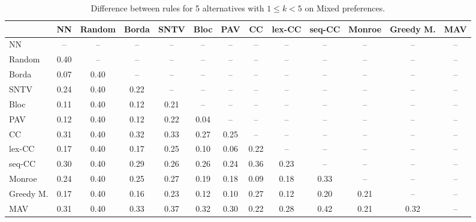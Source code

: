 
\begin{table*}[htbp]
\centering
\begin{tabular}{lcccccccccccc}
\toprule
 & NN & Random & Borda & SNTV & Bloc & PAV & CC & lex-CC & seq-CC & Monroe & Greedy M. & MAV \\
\midrule
NN & -- & -- & -- & -- & -- & -- & -- & -- & -- & -- & -- & -- \\
Random & \cellcolor{blue!40} 0.40 & -- & -- & -- & -- & -- & -- & -- & -- & -- & -- & -- \\
Borda & \cellcolor{blue!7} 0.07 & \cellcolor{blue!40} 0.40 & -- & -- & -- & -- & -- & -- & -- & -- & -- & -- \\
SNTV & \cellcolor{blue!24} 0.24 & \cellcolor{blue!40} 0.40 & \cellcolor{blue!22} 0.22 & -- & -- & -- & -- & -- & -- & -- & -- & -- \\
Bloc & \cellcolor{blue!11} 0.11 & \cellcolor{blue!40} 0.40 & \cellcolor{blue!12} 0.12 & \cellcolor{blue!21} 0.21 & -- & -- & -- & -- & -- & -- & -- & -- \\
PAV & \cellcolor{blue!12} 0.12 & \cellcolor{blue!40} 0.40 & \cellcolor{blue!12} 0.12 & \cellcolor{blue!22} 0.22 & \cellcolor{blue!4} 0.04 & -- & -- & -- & -- & -- & -- & -- \\
CC & \cellcolor{blue!31} 0.31 & \cellcolor{blue!40} 0.40 & \cellcolor{blue!32} 0.32 & \cellcolor{blue!33} 0.33 & \cellcolor{blue!27} 0.27 & \cellcolor{blue!25} 0.25 & -- & -- & -- & -- & -- & -- \\
lex-CC & \cellcolor{blue!17} 0.17 & \cellcolor{blue!40} 0.40 & \cellcolor{blue!17} 0.17 & \cellcolor{blue!25} 0.25 & \cellcolor{blue!10} 0.10 & \cellcolor{blue!6} 0.06 & \cellcolor{blue!22} 0.22 & -- & -- & -- & -- & -- \\
seq-CC & \cellcolor{blue!30} 0.30 & \cellcolor{blue!40} 0.40 & \cellcolor{blue!28} 0.29 & \cellcolor{blue!26} 0.26 & \cellcolor{blue!26} 0.26 & \cellcolor{blue!24} 0.24 & \cellcolor{blue!36} 0.36 & \cellcolor{blue!23} 0.23 & -- & -- & -- & -- \\
Monroe & \cellcolor{blue!24} 0.24 & \cellcolor{blue!40} 0.40 & \cellcolor{blue!25} 0.25 & \cellcolor{blue!27} 0.27 & \cellcolor{blue!19} 0.19 & \cellcolor{blue!18} 0.18 & \cellcolor{blue!9} 0.09 & \cellcolor{blue!18} 0.18 & \cellcolor{blue!33} 0.33 & -- & -- & -- \\
Greedy M. & \cellcolor{blue!17} 0.17 & \cellcolor{blue!40} 0.40 & \cellcolor{blue!16} 0.16 & \cellcolor{blue!23} 0.23 & \cellcolor{blue!12} 0.12 & \cellcolor{blue!10} 0.10 & \cellcolor{blue!27} 0.27 & \cellcolor{blue!12} 0.12 & \cellcolor{blue!20} 0.20 & \cellcolor{blue!21} 0.21 & -- & -- \\
MAV & \cellcolor{blue!31} 0.31 & \cellcolor{blue!40} 0.40 & \cellcolor{blue!33} 0.33 & \cellcolor{blue!37} 0.37 & \cellcolor{blue!32} 0.32 & \cellcolor{blue!30} 0.30 & \cellcolor{blue!22} 0.22 & \cellcolor{blue!28} 0.28 & \cellcolor{blue!42} 0.42 & \cellcolor{blue!21} 0.21 & \cellcolor{blue!32} 0.32 & -- \\
\bottomrule
\end{tabular}

\caption{Difference between rules for 5 alternatives with $1 \leq k < 5$ on Mixed preferences.}
\label{tab:rule_distance_heatmap-m=[5]-pref_dist=mixed}
\end{table*}
    